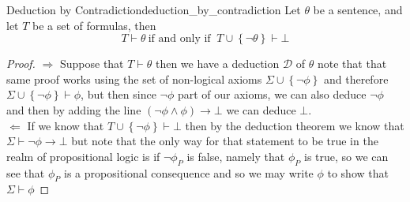 \begin{proposition}{Deduction by Contradiction}{deduction_by_contradiction}
Let $ \theta  $ be a sentence, and let $ T $ be a set of formulas, then 
\[
T \vdash \theta ~\text{if and only if }~ T \cup  \left\{ \neg \theta  \right\}  \vdash \bot 
\]
\end{proposition}
\begin{proof}
    $ \Rightarrow  $ Suppose that $ T \vdash \theta  $ then we have a deduction $ \mathcal{ D }   $ of $ \theta  $ note that that same proof works using the set of non-logical axioms $ \Sigma \cup \left\{ \neg \phi  \right\}  $ and therefore $ \Sigma \cup \left\{ \neg \phi  \right\}  \vdash \phi $, but then since $ \neg \phi  $ part of our axioms, we can also deduce $ \neg \phi  $ and then by adding the line $ \left( \neg \phi \land  \phi  \right) \rightarrow \bot  $ we can deduce $ \bot  $. \\ 
    $ \Leftarrow  $ If we know that $ T \cup \left\{ \neg \phi  \right\} \vdash \bot   $ then by the deduction theorem we know that $ \Sigma \vdash \neg \phi \rightarrow \bot  $ but note that the only way for that statement to be true in the realm of propositional logic is if $ \neg \phi _{ P }   $ is false, namely that $ \phi _{ P }   $ is true, so we can see that $ \phi _{ P }  $ is a propositional consequence and so we may write $ \phi  $ to show that $ \Sigma \vdash \phi  $ 
\end{proof}

